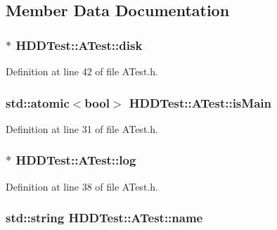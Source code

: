 \subsection{Member Data Documentation}
\hypertarget{class_h_d_d_test_1_1_a_test_a8299c80c0778b70fabcc8af49e3f0334}{
\subsubsection[{disk}]{$\ast$ H\-D\-D\-Test\-::\-A\-Test\-::disk\hspace{0.3cm}{\ttfamily [protected]}}}\label{class_h_d_d_test_1_1_a_test_a8299c80c0778b70fabcc8af49e3f0334}


Definition at line 42 of file A\-Test.\-h.

\hypertarget{class_h_d_d_test_1_1_a_test_ac32f948a2541934bba8137e20987bf71}{
\subsubsection[{is\-Main}]{\setlength{\rightskip}{0pt plus 5cm}std\-::atomic$<$bool$>$ H\-D\-D\-Test\-::\-A\-Test\-::is\-Main}}\label{class_h_d_d_test_1_1_a_test_ac32f948a2541934bba8137e20987bf71}


Definition at line 31 of file A\-Test.\-h.

\hypertarget{class_h_d_d_test_1_1_a_test_a5db6314a0231c885e25a9c98ea41e95a}{
\subsubsection[{log}]{$\ast$ H\-D\-D\-Test\-::\-A\-Test\-::log}}\label{class_h_d_d_test_1_1_a_test_a5db6314a0231c885e25a9c98ea41e95a}


Definition at line 38 of file A\-Test.\-h.

\hypertarget{class_h_d_d_test_1_1_a_test_aa7570476c8072fbbf8ec24c8f997656f}{
\subsubsection[{name}]{\setlength{\rightskip}{0pt plus 5cm}std\-::string H\-D\-D\-Test\-::\-A\-Test\-::name}}\label{class_h_d_d_test_1_1_a_test_aa7570476c8072fbbf8ec24c8f997656f}


